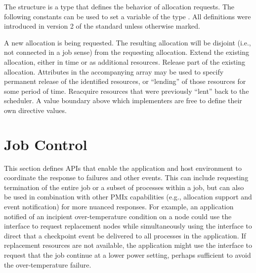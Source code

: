 The  structure is a  type that defines the behavior of allocation requests.
The following constants can be used to set a variable of the type . All definitions were introduced in version 2 of the standard unless otherwise marked.

\begin{constantdesc}
%
A new allocation is being requested.
The resulting allocation will be disjoint (i.e., not connected in a job sense) from the requesting allocation.
%
Extend the existing allocation, either in time or as additional resources.
%
Release part of the existing allocation.
Attributes in the accompanying  array may be used to specify permanent release of the identified resources, or ``lending'' of those resources for some period of time.
%
Reacquire resources that were previously ``lent'' back to the scheduler.
%
A value boundary above which implementers are free to define their own directive values.
%
\end{constantdesc}



\section{Job Control}
\label{chap:api_job_mgmt:jctrl}

This section defines \acp{API} that enable the application and host environment to coordinate the response to failures and other events.
This can include requesting termination of the entire job or a subset of processes within a job, but can
also be used in combination with other \ac{PMIx} capabilities (e.g., allocation support and event notification) for more nuanced responses. For example, an application notified of an incipient over-temperature condition on a node could use the  interface to request replacement nodes while simultaneously using the  interface to direct that a checkpoint event be delivered to all processes in the application. If replacement resources are not available, the application might use the  interface to request that the job continue at a lower power setting, perhaps sufficient to avoid the over-temperature failure.

